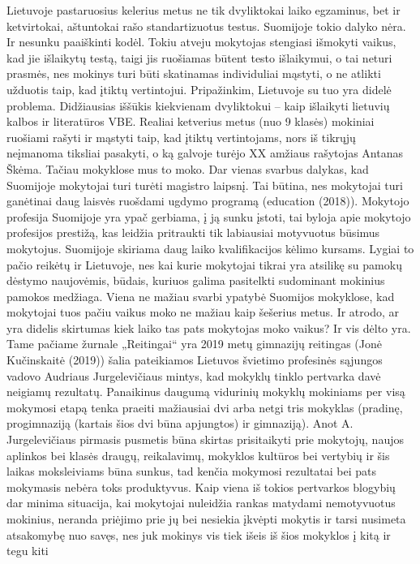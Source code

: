 \documentclass[]{article}
\begin{document}
Lietuvoje pastaruosius kelerius metus ne tik dvyliktokai laiko
egzaminus, bet ir ketvirtokai, aštuntokai rašo standartizuotus testus.
Suomijoje tokio dalyko nėra. Ir nesunku paaiškinti kodėl. Tokiu atveju
mokytojas stengiasi išmokyti vaikus, kad jie išlaikytų testą, taigi jis
ruošiamas būtent testo išlaikymui, o tai neturi prasmės, nes mokinys
turi būti skatinamas individuliai mąstyti, o ne atlikti užduotis taip,
kad įtiktų vertintojui. Pripažinkim, Lietuvoje su tuo yra didelė
problema. Didžiausias iššūkis kiekvienam dvyliktokui -- kaip išlaikyti
lietuvių kalbos ir literatūros VBE. Realiai ketverius metus (nuo 9
klasės) mokiniai ruošiami rašyti ir mąstyti taip, kad įtiktų
vertintojams, nors iš tikrųjų neįmanoma tiksliai pasakyti, o ką galvoje
turėjo XX amžiaus rašytojas Antanas Škėma. Tačiau mokyklose mus to moko.
Dar vienas svarbus dalykas, kad Suomijoje mokytojai turi turėti magistro
laipsnį. Tai būtina, nes mokytojai turi ganėtinai daug laisvės ruošdami
ugdymo programą (education (2018)). Mokytojo profesija Suomijoje yra
ypač gerbiama, į ją sunku įstoti, tai byloja apie mokytojo profesijos
prestižą, kas leidžia pritraukti tik labiausiai motyvuotus būsimus
mokytojus. Suomijoje skiriama daug laiko kvalifikacijos kėlimo kursams.
Lygiai to pačio reikėtų ir Lietuvoje, nes kai kurie mokytojai tikrai yra
atsilikę su pamokų dėstymo naujovėmis, būdais, kuriuos galima pasitelkti
sudominant mokinius pamokos medžiaga. Viena ne mažiau svarbi ypatybė
Suomijos mokyklose, kad mokytojai tuos pačiu vaikus moko ne mažiau kaip
šešerius metus. Ir atrodo, ar yra didelis skirtumas kiek laiko tas pats
mokytojas moko vaikus? Ir vis dėlto yra. Tame pačiame žurnale
„Reitingai`` yra 2019 metų gimnazijų reitingas (Jonė Kučinskaitė (2019))
šalia pateikiamos Lietuvos švietimo profesinės sąjungos vadovo Audriaus
Jurgelevičiaus mintys, kad mokyklų tinklo pertvarka davė neigiamų
rezultatų. Panaikinus daugumą vidurinių mokyklų mokiniams per visą
mokymosi etapą tenka praeiti mažiausiai dvi arba netgi tris mokyklas
(pradinę, progimnaziją (kartais šios dvi būna apjungtos) ir gimnaziją).
Anot A. Jurgelevičiaus pirmasis pusmetis būna skirtas prisitaikyti prie
mokytojų, naujos aplinkos bei klasės draugų, reikalavimų, mokyklos
kultūros bei vertybių ir šis laikas moksleiviams būna sunkus, tad kenčia
mokymosi rezultatai bei pats mokymasis nebėra toks produktyvus. Kaip
viena iš tokios pertvarkos blogybių dar minima situacija, kai mokytojai
nuleidžia rankas matydami nemotyvuotus mokinius, neranda priėjimo prie
jų bei nesiekia įkvėpti mokytis ir tarsi nusimeta atsakomybę nuo savęs,
nes juk mokinys vis tiek išeis iš šios mokyklos į kitą ir tegu kiti
\end{document}
